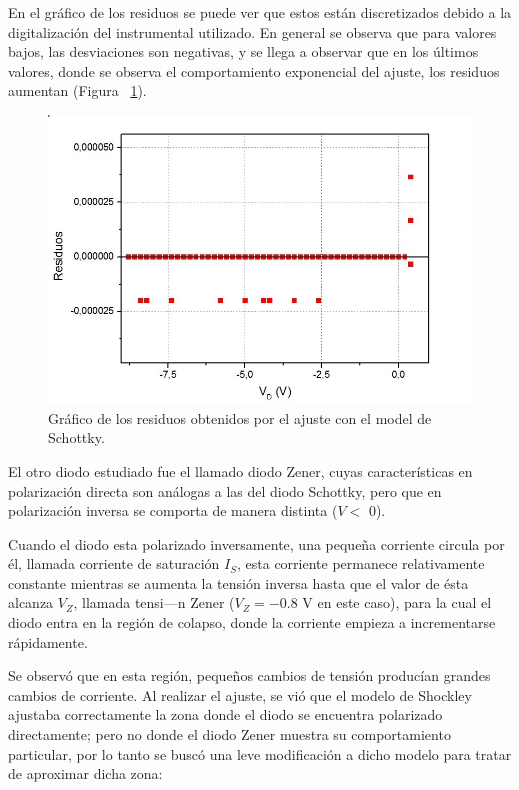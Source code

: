 \documentclass[twoside,twocolumn,a4paper]{article}
\begin{document}
En el gr\'afico de los residuos se puede ver que estos est\'an discretizados debido a la digitalizaci\'on del instrumental utilizado. En general se observa que para valores bajos, las desviaciones son negativas, y se llega a observar que en los \'ultimos valores, donde se observa el comportamiento exponencial del ajuste, los residuos aumentan (Figura ~\ref{fig:res}).

\begin{figure}[H]
\includegraphics[width=\linewidth]{residuos.jpg}
\captionsetup{justification=centering}
\caption{Gr\'afico de los residuos obtenidos por el ajuste con el model de Schottky.}
\label{fig:res}
\end{figure}

El otro diodo estudiado fue el llamado diodo Zener, cuyas caracter\'isticas en polarizaci\'on directa son an\'alogas a las del diodo Schottky, pero que en polarizaci\'on inversa se comporta de manera distinta ($V <$ 0).


Cuando el diodo esta polarizado inversamente, una peque\~na corriente circula por \'el, llamada corriente de saturaci\'on $I_{S}$, esta corriente permanece relativamente constante mientras se aumenta la tensi\'on inversa hasta que el valor de \'esta alcanza $V_{Z}$, llamada tensi—n Zener ($V_{Z} = - 0.8$ V en este caso), para la cual el diodo entra en la regi\'on de colapso, donde la corriente empieza a incrementarse r\'apidamente.

Se observ\'o que en esta regi\'on, peque\~nos cambios de tensi\'on produc\'ian grandes cambios de corriente. Al realizar el ajuste, se vi\'o que el modelo de Shockley ajustaba correctamente la zona donde el diodo se encuentra polarizado directamente; pero no donde el diodo Zener muestra su comportamiento particular, por lo tanto se busc\'o una leve modificaci\'on a dicho modelo para tratar de aproximar dicha zona:
\end{document}
